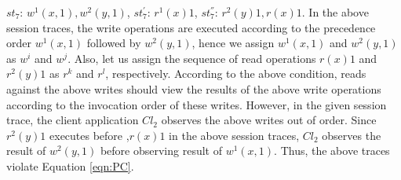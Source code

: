 \documentclass[journal,compsoc]{IEEEtran}
\begin{document}
   $\mathit{st}_7$: $w^1(x,1), w^2(y,1)$,    $\mathit{st}_7^{'}$: $r^1(x){1}$,  $\mathit{st}_7^{''}$:
  $r^2(y){1}, r(x){1}$. 
  In the above session traces, the write operations  are executed according to the precedence order
  $w^1(x,1)$ followed by $ w^2(y,1)$, hence we assign $w^1(x,1)$ and $ w^2(y,1)$ as $w^i$ and $w^j$. Also, let us assign
  the sequence of read operations $r(x){1}$  and $r^2(y){1}$ as $r^k$ and $r^l$, respectively. According to the
   above condition, reads against the above writes should view the results of the above write operations
  according to the invocation order of these writes. However, in the given session trace, the client application
  $\mathit{Cl}_2$ observes the above writes out of order. Since  $r^2(y){1}$ executes before ,$r(x){1}$ in the above session
  traces, $\mathit{Cl}_2$ observes the result of $w^2(y,1)$ before observing result of $w^1(x,1)$. 
   Thus,
   the above traces violate Equation \ref{eqn:PC}.
\end{document}
